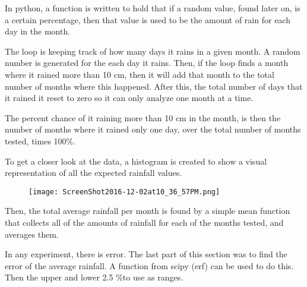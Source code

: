 \documentclass{revtex4}
\begin{document}
In python, a function is written to hold that if a random value, found later on, is a certain percentage, then that value is used to be the amount of rain for each day in the month. 

The loop is keeping track of how many days it rains in a given month. A random number is generated for the each day it rains. Then, if the loop finds a month where it rained more than 10 cm, then it will add that month to the total number of months where this happened. After this, the total number of days that it rained it reset to zero so it can only analyze one month at a time. 

The percent chance of it raining more than 10 cm in the month, is then the number of months where it rained only one day, over the total number of months tested, times 100\%. 

To get a closer look at the data, a histogram is created to show a visual representation of all the expected rainfall values. 


\begin{figure}[h!]
\centering
\texttt{[image: ScreenShot2016-12-02at10\_36\_57PM.png]}
\end{figure}

Then, the total average rainfall per month is found by a simple mean function that collects all of the amounts of rainfall for each of the months tested, and averages them. 

In any experiment, there is error. The last part of this section was to find the error of the average rainfall. A function from scipy (erf) can be used to do this. Then the upper and lower 2.5 \%to use as ranges. 
\end{document}
